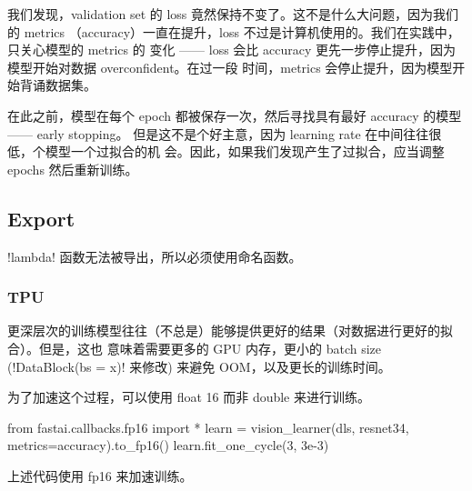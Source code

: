 \documentclass{ctexart}
\newenvironment{monos}{\VerbatimEnvironment\begin{pythoncode}}{\end{pythoncode}}
\begin{document}
我们发现，validation set 的 loss 竟然保持不变了。这不是什么大问题，因为我们的 metrics
（accuracy）一直在提升，loss 不过是计算机使用的。我们在实践中，只关心模型的 metrics 的
变化 —— loss 会比 accuracy 更先一步停止提升，因为模型开始对数据 overconfident。在过一段
时间，metrics 会停止提升，因为模型开始背诵数据集。

在此之前，模型在每个 epoch 都被保存一次，然后寻找具有最好 accuracy 的模型 —— early
stopping。 但是这不是个好主意，因为 learning rate 在中间往往很低，个模型一个过拟合的机
会。因此，如果我们发现产生了过拟合，应当调整 epochs 然后重新训练。

\subsection{Export}

\mono!lambda! 函数无法被导出，所以必须使用命名函数。



\subsubsection{TPU}

更深层次的训练模型往往（不总是）能够提供更好的结果（对数据进行更好的拟合）。但是，这也
意味着需要更多的 GPU 内存，更小的 batch size (\mono!DataBlock(bs = x)! 来修改) 来避免
OOM，以及更长的训练时间。

为了加速这个过程，可以使用 float 16 而非 double 来进行训练。

\begin{monos}
from fastai.callbacks.fp16 import *
learn = vision_learner(dls, resnet34, metrics=accuracy).to_fp16()
learn.fit_one_cycle(3, 3e-3)
\end{monos}

上述代码使用 fp16 来加速训练。
\end{document}
